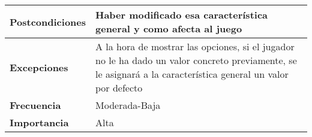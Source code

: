 \begin{longtable}{lll}
\textbf{Postcondiciones}                         & \multicolumn{2}{l}{Haber modificado esa característica general y como afecta al juego}                                                                                             \\ \hline
\textbf{Excepciones}                             & \multicolumn{2}{l}{A la hora de mostrar las opciones, si el jugador no le ha dado un valor concreto previamente, se le asignará  a la característica general un valor por defecto} \\ \hline
\textbf{Frecuencia}                              & \multicolumn{2}{l}{Moderada-Baja}                                                                                                                                                  \\ \hline
\textbf{Importancia}                             & \multicolumn{2}{l}{Alta}                                                                                                                                                           \\ \hline
\end{longtable}

